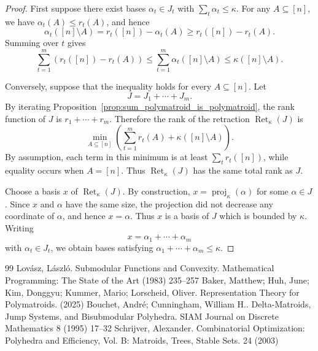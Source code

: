\documentclass[10pt,a4paper]{amsart}
\DeclareMathOperator{\proj}{proj}              %
\newcommand{\kproj}{\proj_{\kappa}}            %
\DeclareMathOperator{\Ret}{Ret}                %
\newcommand{\RetK}{\Ret_{\kappa}}              %
\begin{document}
\begin{proof}
    First suppose there exist bases $\alpha_t\in J_t$ with
    $\sum_t\alpha_t\leq\kappa$. For any $A\subseteq[n]$, we have
    $\alpha_t(A)\leq r_t(A)$, and hence
    \[
        \alpha_t([n]\setminus A)
        =
        r_t([n])-\alpha_t(A)
        \geq
        r_t([n])-r_t(A).
    \]
    Summing over $t$ gives
    \[
        \sum_{t=1}^m
        \left(
            r_t([n])-r_t(A)
        \right)
        \leq
        \sum_{t=1}^m\alpha_t([n]\setminus A)
        \leq
        \kappa([n]\setminus A).
    \]

    Conversely, suppose that the inequality holds for every
    $A\subseteq[n]$. Let
    \[
        J=J_1+\cdots+J_m.
    \]
    By iterating
    Proposition~\ref{prop:sum_polymatroid_is_polymatroid}, the rank
    function of $J$ is $r_1+\cdots+r_m$. Therefore the rank of the
    retraction $\RetK(J)$ is
    \[
        \min_{A\subseteq[n]}
        \left(
            \sum_{t=1}^m r_t(A)
            +
            \kappa([n]\setminus A)
        \right).
    \]
    By assumption, each term in this minimum is at least
    $\sum_t r_t([n])$, while equality occurs when $A=[n]$. Thus
    $\RetK(J)$ has the same total rank as $J$.

    Choose a basis $x$ of $\RetK(J)$. By construction,
    $x=\kproj(\alpha)$ for some $\alpha\in J$. Since $x$ and $\alpha$ have
    the same size, the projection did not decrease any coordinate of
    $\alpha$, and hence $x=\alpha$. Thus $x$ is a basis of $J$ which is
    bounded by $\kappa$. Writing
    \[
        x=\alpha_1+\cdots+\alpha_m
    \]
    with $\alpha_t\in J_t$, we obtain bases satisfying
    $\alpha_1+\cdots+\alpha_m\leq\kappa$.
\end{proof}


\begin{thebibliography}{99}
 Lov{\'a}sz, L{\'a}szl{\'o. Submodular Functions and Convexity. Mathematical Programming: The State of the Art (1983) 235--257
 Baker, Matthew; Huh, June; Kim, Donggyu; Kummer, Mario; Lorscheid, Oliver. Representation Theory for Polymatroids. (2025)
 Bouchet, Andr{\'e}; Cunningham, William H.. Delta}-Matroids, Jump Systems, and Bisubmodular Polyhedra. SIAM Journal on Discrete Mathematics 8 (1995) 17--32
 Schrijver, Alexander. Combinatorial Optimization: Polyhedra and Efficiency, Vol. B: Matroids, Trees, Stable Sets. 24 (2003)
\end{thebibliography}
\end{document}
